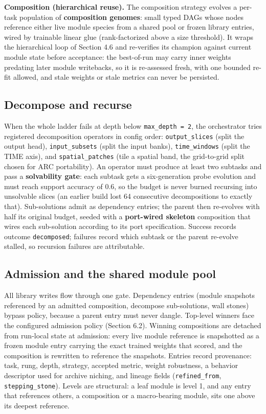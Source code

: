 \documentclass[11pt]{article}
\begin{document}
\textbf{Composition (hierarchical reuse).} The composition strategy evolves a per-task population of \textbf{composition genomes}: small typed DAGs whose nodes reference either live module species from a shared pool or frozen library entries, wired by trainable linear glue (rank-factorized above a size threshold). It wraps the hierarchical loop of Section 4.6 and re-verifies its champion against current module state before acceptance: the best-of-run may carry inner weights predating later module writebacks, so it is re-assessed fresh, with one bounded re-fit allowed, and stale weights or stale metrics can never be persisted.

\subsection{Decompose and recurse}

When the whole ladder fails at depth below \texttt{max_depth = 2}, the orchestrator tries registered decomposition operators in config order: \texttt{output_slices} (split the output head), \texttt{input_subsets} (split the input banks), \texttt{time_windows} (split the TIME axis), and \texttt{spatial_patches} (tile a spatial band, the grid-to-grid split chosen for ARC portability). An operator must produce at least two subtasks and pass a \textbf{solvability gate}: each subtask gets a six-generation probe evolution and must reach support accuracy of 0.6, so the budget is never burned recursing into unsolvable slices (an earlier build lost 64 consecutive decompositions to exactly that). Sub-solutions admit as dependency entries; the parent then re-evolves with half its original budget, seeded with a \textbf{port-wired skeleton} composition that wires each sub-solution according to its port specification. Success records outcome \texttt{decomposed}; failures record which subtask or the parent re-evolve stalled, so recursion failures are attributable.

\subsection{Admission and the shared module pool}

All library writes flow through one gate. Dependency entries (module snapshots referenced by an admitted composition, decompose sub-solutions, wall stones) bypass policy, because a parent entry must never dangle. Top-level winners face the configured admission policy (Section 6.2). Winning compositions are detached from run-local state at admission: every live module reference is snapshotted as a frozen module entry carrying the exact trained weights that scored, and the composition is rewritten to reference the snapshots. Entries record provenance: task, rung, depth, strategy, accepted metric, weight robustness, a behavior descriptor used for archive niching, and lineage fields (\texttt{refined_from}, \texttt{stepping_stone}). Levels are structural: a leaf module is level 1, and any entry that references others, a composition or a macro-bearing module, sits one above its deepest reference.
\end{document}
